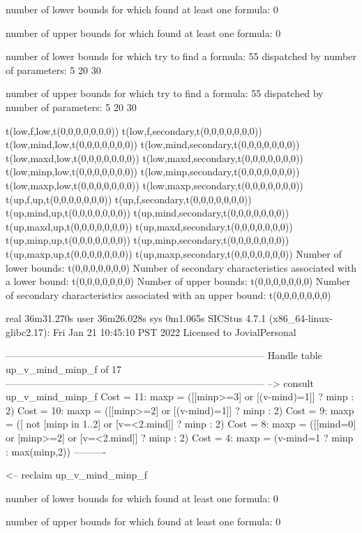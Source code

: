number of lower bounds for which found at least one formula: 0

number of upper bounds for which found at least one formula: 0

number of lower bounds for which try to find a formula: 55
dispatched by number of parameters: 5  20  30

number of upper bounds for which try to find a formula: 55
dispatched by number of parameters: 5  20  30

t(low,f,low,t(0,0,0,0,0,0,0))
t(low,f,secondary,t(0,0,0,0,0,0,0))
t(low,mind,low,t(0,0,0,0,0,0,0))
t(low,mind,secondary,t(0,0,0,0,0,0,0))
t(low,maxd,low,t(0,0,0,0,0,0,0))
t(low,maxd,secondary,t(0,0,0,0,0,0,0))
t(low,minp,low,t(0,0,0,0,0,0,0))
t(low,minp,secondary,t(0,0,0,0,0,0,0))
t(low,maxp,low,t(0,0,0,0,0,0,0))
t(low,maxp,secondary,t(0,0,0,0,0,0,0))
t(up,f,up,t(0,0,0,0,0,0,0))
t(up,f,secondary,t(0,0,0,0,0,0,0))
t(up,mind,up,t(0,0,0,0,0,0,0))
t(up,mind,secondary,t(0,0,0,0,0,0,0))
t(up,maxd,up,t(0,0,0,0,0,0,0))
t(up,maxd,secondary,t(0,0,0,0,0,0,0))
t(up,minp,up,t(0,0,0,0,0,0,0))
t(up,minp,secondary,t(0,0,0,0,0,0,0))
t(up,maxp,up,t(0,0,0,0,0,0,0))
t(up,maxp,secondary,t(0,0,0,0,0,0,0))
Number of lower bounds:                                             t(0,0,0,0,0,0,0)
Number of secondary characteristics associated with a lower bound:  t(0,0,0,0,0,0,0)
Number of upper bounds:                                             t(0,0,0,0,0,0,0)
Number of secondary characteristics associated with an upper bound: t(0,0,0,0,0,0,0)

real	36m31.270s
user	36m26.028s
sys	0m1.065s
SICStus 4.7.1 (x86_64-linux-glibc2.17): Fri Jan 21 10:45:10 PST 2022
Licensed to JovialPersonal


--------------------------------------------------------------------------------
Handle table up_v_mind_minp_f of 17
--------------------------------------------------------------------------------
--> consult up_v_mind_minp_f
Cost = 11:  maxp = ([[minp>=3] or [(v-mind)=1]] ? minp : 2)
Cost = 10:  maxp = ([[minp>=2] or [(v-mind)=1]] ? minp : 2)
Cost =  9:  maxp = ([ not [minp in 1..2] or [v=<2.mind]] ? minp : 2)
Cost =  8:  maxp = ([[mind=0] or [minp>=2] or [v=<2.mind]] ? minp : 2)
Cost =  4:  maxp = (v-mind=1 ? minp : max(minp,2))
----------

<-- reclaim up_v_mind_minp_f

number of lower bounds for which found at least one formula: 0

number of upper bounds for which found at least one formula: 0


